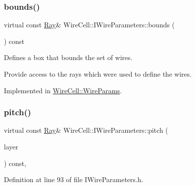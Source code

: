 \subsubsection{\texorpdfstring{bounds()}{bounds()}}
{\footnotesize\ttfamily virtual const \hyperlink{namespace_wire_cell_a3ab20d9b438feb7eb1ffaab9ba98af0c}{Ray}\& Wire\+Cell\+::\+I\+Wire\+Parameters\+::bounds (\begin{DoxyParamCaption}{ }\end{DoxyParamCaption}) const\hspace{0.3cm}{\ttfamily [pure virtual]}}



Defines a box that bounds the set of wires. 

Provide access to the rays which were used to define the wires. 

Implemented in \hyperlink{class_wire_cell_1_1_wire_params_a20e01f2e7d229f28e0e2d414b36b4e57}{Wire\+Cell\+::\+Wire\+Params}.

\mbox{\label{class_wire_cell_1_1_i_wire_parameters_aafb960715541113e82448f74e0f34e46}} 
\subsubsection{\texorpdfstring{pitch()}{pitch()}}
{\footnotesize\ttfamily virtual const \hyperlink{namespace_wire_cell_a3ab20d9b438feb7eb1ffaab9ba98af0c}{Ray}\& Wire\+Cell\+::\+I\+Wire\+Parameters\+::pitch (\begin{DoxyParamCaption}\item[{\hyperlink{namespace_wire_cell_a761397ff086f0a7e1a1d9ccd251ac618}{Wire\+Cell\+::\+Wire\+Plane\+Layer\+\_\+t}}]{layer }\end{DoxyParamCaption}) const\hspace{0.3cm}{\ttfamily [inline]}, {\ttfamily [virtual]}}



Definition at line 93 of file I\+Wire\+Parameters.\+h.

